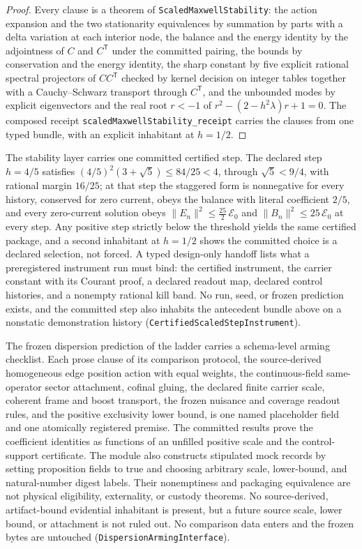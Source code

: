 \documentclass[11pt]{article}
\theoremstyle{remark}
\theoremstyle{plain}
\begin{document}
\begin{proof}
Every clause is a theorem of \texttt{ScaledMaxwellStability}: the action
expansion and the two stationarity equivalences by summation by parts with a
delta variation at each interior node, the balance and the energy identity by
the adjointness of \(C\) and \(C^{\mathsf T}\) under the committed pairing, the
bounds by conservation and the energy identity, the sharp constant by five
explicit rational spectral projectors of \(CC^{\mathsf T}\) checked by kernel
decision on integer tables together with a Cauchy--Schwarz transport through
\(C^{\mathsf T}\), and the unbounded modes by explicit eigenvectors and the
real root \(r<-1\) of \(r^2-(2-h^2\lambda)r+1=0\). The composed receipt
\texttt{scaledMaxwellStability\_receipt} carries the clauses from one typed
bundle, with an explicit inhabitant at \(h=1/2\).
\end{proof}

The stability layer carries one committed certified step. The declared step
\(h=4/5\) satisfies \((4/5)^2(3+\sqrt5)\le 84/25<4\), through
\(\sqrt5<9/4\), with rational margin \(16/25\); at that step the staggered
form is nonnegative for every history, conserved for zero current, obeys
the balance with literal coefficient \(2/5\), and every zero-current
solution obeys \(\lVert E_n\rVert^2\le\tfrac{25}2\,\mathcal E_0\) and
\(\lVert B_n\rVert^2\le 25\,\mathcal E_0\) at every step. Any positive step
strictly below the threshold yields the same certified package, and a
second inhabitant at \(h=1/2\) shows the committed choice is a declared
selection, not forced. A typed design-only handoff lists what a
preregistered instrument run must bind: the certified instrument, the
carrier constant with its Courant proof, a declared readout map, declared
control histories, and a nonempty rational kill band. No run, seed, or
frozen prediction exists, and the committed step also inhabits the
antecedent bundle above on a nonstatic demonstration history
(\texttt{CertifiedScaledStepInstrument}).

The frozen dispersion prediction of the ladder carries a schema-level
arming checklist. Each prose clause of its comparison protocol, the source-derived
homogeneous edge position action with equal weights, the continuous-field
same-operator sector attachment, cofinal gluing, the declared finite
carrier scale, coherent frame and boost transport, the frozen nuisance
and coverage readout rules, and the positive exclusivity lower bound, is
one named placeholder field and one atomically registered premise. The
committed results prove the coefficient identities as functions of an
unfilled positive scale and the control-support certificate. The module
also constructs stipulated mock records by setting proposition fields to
true and choosing arbitrary scale, lower-bound, and natural-number digest
labels. Their nonemptiness and packaging equivalence are not physical
eligibility, externality, or custody theorems. No source-derived,
artifact-bound evidential inhabitant is present, but a future source scale,
lower bound, or attachment is not ruled out. No comparison data enters and
the frozen bytes are untouched (\texttt{DispersionArmingInterface}).
\end{document}
